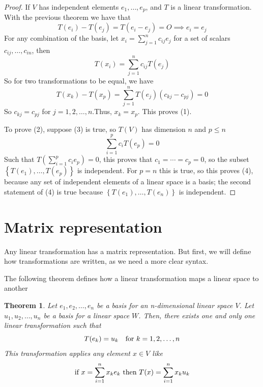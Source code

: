 \documentclass{book}
\newtheorem{theorem}{Theorem}[section]
\begin{document}
\begin{proof}
    If $V$ has independent elements $e_1,\dots,e_p$, and $T$ is a linear transformation.
    With the previous theorem we have that
    \begin{equation}
        T(e_i) - T(e_j) = T(e_i - e_j) = O \implies e_i = e_j
    \end{equation}
    For any combination of the basis, let $x_i =\sum_{j=1}^{n}{c_{ij} e_j}$ for a
    set of scalars $c_{ij},\dots,c_{in}$, then
    \begin{equation}
        T(x_i) = \sum_{j=1}^{n}{c_{ij} T(e_j)}
    \end{equation}
    So for two transformations to be equal, we have
    \begin{equation}
        T(x_k) - T(x_p) = \sum_{j=1}^{n}{T(e_j)(c_{kj} - c_{pj})} = 0
    \end{equation}
    So $c_{kj} = c_{pj}$ for $j=1,2,\dots,n$.Thus, $x_k=x_p$. This proves (1).

    To prove (2), suppose (3) is true, so $T(V)$ has dimension $n$ and $p\leq n$
    \begin{equation}
        \sum_{i=1}^{p}c_i{T(e_p)}=0
    \end{equation}
    Such that $T\left(\sum_{i=1}^{p}c_i{e_p}\right)=0$, this proves that $c_1 = \cdots = c_p = 0$, so
    the subset $\left\{T(e_1),\dots,T(e_p)\right\}$ is independent. For $p=n$ this is true, so this proves
    (4), because any set of independent elements of a linear space is a basis; the second
    statement of (4) is true because $\left\{T(e_1),\dots,T(e_n)\right\}$ is independent.
\end{proof}

\section{Matrix representation}

Any linear transformation has a matrix representation. But first, we will
define how transformations are written, as we need a more clear syntax.

The following theorem defines how a linear transformation maps a linear space
to another

\begin{theorem}
    Let $e_1,e_2,\dots,e_n$ be a basis for an n-dimensional linear space $V$. Let $u_1,u_2,\dots,u_n$ be a basis
    for a linear space $W$. Then, there exists one and only one linear transformation such that
    \begin{equation}
        T(e_k) = u_k \quad \textnormal{for } k=1,2,\dots,n
    \end{equation}
    This transformation applies any element $x\in V$ like
    \begin{equation}
        \textnormal{if }x=\sum_{i=1}^{n}{x_k e_k}\textnormal{ then } T(x)=\sum_{i=1}^{n}{x_k u_k}
    \end{equation}
\end{theorem}
\end{document}

